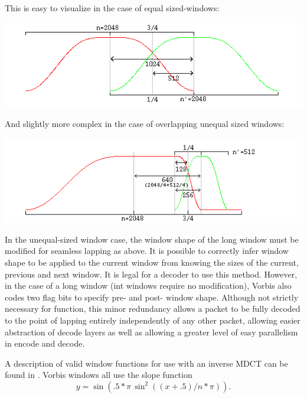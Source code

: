 This is easy to visualize in the case of equal sized-windows:

\begin{center}
\includegraphics[width=\textwidth]{window1}
\end{center}

And slightly more complex in the case of overlapping unequal sized
windows:

\begin{center}
\includegraphics[width=\textwidth]{window2}
\end{center}

In the unequal-sized window case, the window shape of the long window
must be modified for seamless lapping as above.  It is possible to
correctly infer window shape to be applied to the current window from
knowing the sizes of the current, previous and next window.  It is
legal for a decoder to use this method. However, in the case of a long
window (int windows require no modification), Vorbis also codes two
flag bits to specify pre- and post- window shape.  Although not
strictly necessary for function, this minor redundancy allows a packet
to be fully decoded to the point of lapping entirely independently of
any other packet, allowing easier abstraction of decode layers as well
as allowing a greater level of easy parallelism in encode and
decode.

A description of valid window functions for use with an inverse MDCT
can be found in \cite{Sporer/Brandenburg/Edler}.  Vorbis windows
all use the slope function
\[ y = \sin(.5*\pi \, \sin^2((x+.5)/n*\pi)) . \]




